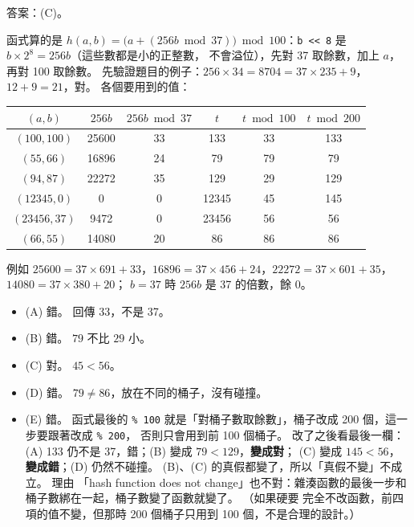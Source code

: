 \begin{pastsoln}
答案：(C)。

函式算的是 $h(a, b) = \bigl(a + (256b \bmod 37)\bigr) \bmod 100$：\texttt{b << 8} 是 $b \times 2^8 = 256b$（這些數都是小的正整數，
不會溢位），先對 37 取餘數，加上 $a$，再對 100 取餘數。 先驗證題目的例子：$256 \times 34 = 8704 = 37 \times 235 + 9$，
$12 + 9 = 21$，對。 各個要用到的值：
\begin{center}
\begin{tabular}{cccccc}
\toprule
$(a, b)$ & $256b$ & $256b \bmod 37$ & $t$ & $t \bmod 100$ & $t \bmod 200$ \\
\midrule
$(100, 100)$ & 25600 & 33 & 133 & 33 & 133 \\
$(55, 66)$ & 16896 & 24 & 79 & 79 & 79 \\
$(94, 87)$ & 22272 & 35 & 129 & 29 & 129 \\
$(12345, 0)$ & 0 & 0 & 12345 & 45 & 145 \\
$(23456, 37)$ & 9472 & 0 & 23456 & 56 & 56 \\
$(66, 55)$ & 14080 & 20 & 86 & 86 & 86 \\
\bottomrule
\end{tabular}
\end{center}
例如 $25600 = 37 \times 691 + 33$，$16896 = 37 \times 456 + 24$，$22272 = 37 \times 601 + 35$，$14080 = 37 \times 380 + 20$；
$b = 37$ 時 $256b$ 是 37 的倍數，餘 0。

\begin{itemize}
\item (A) 錯。 回傳 33，不是 37。
\item (B) 錯。 $79$ 不比 $29$ 小。
\item (C) 對。 $45 < 56$。
\item (D) 錯。 $79 \ne 86$，放在不同的桶子，沒有碰撞。
\item (E) 錯。 函式最後的 \texttt{\% 100} 就是「對桶子數取餘數」，桶子改成 200 個，這一步要跟著改成 \texttt{\% 200}，
否則只會用到前 100 個桶子。 改了之後看最後一欄：(A) 133 仍不是 37，錯；(B) 變成 $79 < 129$，\textbf{變成對}；
(C) 變成 $145 < 56$，\textbf{變成錯}；(D) 仍然不碰撞。 (B)、(C) 的真假都變了，所以「真假不變」不成立。 理由
「hash function does not change」也不對：雜湊函數的最後一步和桶子數綁在一起，桶子數變了函數就變了。 （如果硬要
完全不改函數，前四項的值不變，但那時 200 個桶子只用到 100 個，不是合理的設計。）
\end{itemize}
\end{pastsoln}
